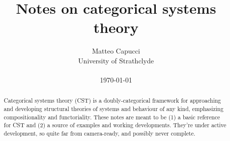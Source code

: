 \documentclass[english]{paper}
\title{Notes on categorical systems theory}
\author{Matteo Capucci\\University of Strathclyde\\\\\today}
\begin{document}

	\maketitle

	\begin{abstract}
		Categorical systems theory (CST) is a doubly-categorical framework for approaching and developing structural theories of systems and behaviour of any kind, emphasizing compositionality and functoriality.
		These notes are meant to be (1) a basic reference for CST and (2) a source of examples and working developments.
		They're under active development, so quite far from camera-ready, and possibly never complete.
	\end{abstract}

	\tableofcontents

	
	
	
	

	
	
	

	\printbibliography
\end{document}
